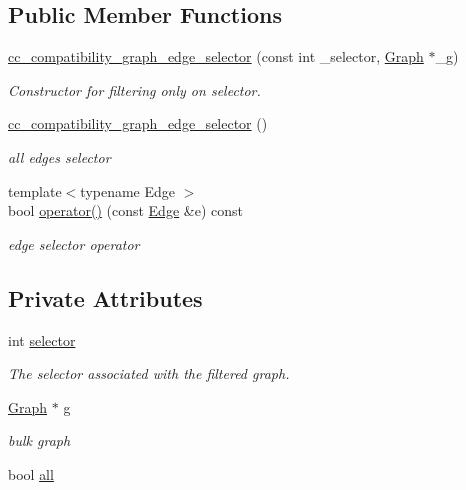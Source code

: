 \subsection*{Public Member Functions}
\begin{DoxyCompactItemize}
\item 
\hyperlink{structcc__compatibility__graph__edge__selector_af34c1bcbf2c4c00e91c295d1c53b2cab}{cc\+\_\+compatibility\+\_\+graph\+\_\+edge\+\_\+selector} (const int \+\_\+selector, \hyperlink{structGraph}{Graph} $\ast$\+\_\+g)
\begin{DoxyCompactList}\small\item\em Constructor for filtering only on selector. \end{DoxyCompactList}\item 
\hyperlink{structcc__compatibility__graph__edge__selector_a0382cacea886b26aa0159f2982160e4f}{cc\+\_\+compatibility\+\_\+graph\+\_\+edge\+\_\+selector} ()
\begin{DoxyCompactList}\small\item\em all edges selector \end{DoxyCompactList}\item 
{\footnotesize template$<$typename Edge $>$ }\\bool \hyperlink{structcc__compatibility__graph__edge__selector_aaf804ff43aded2dc5261789e2e673cc5}{operator()} (const \hyperlink{structEdge}{Edge} \&e) const
\begin{DoxyCompactList}\small\item\em edge selector operator \end{DoxyCompactList}\end{DoxyCompactItemize}
\subsection*{Private Attributes}
\begin{DoxyCompactItemize}
\item 
int \hyperlink{structcc__compatibility__graph__edge__selector_a1f76a7b1a5eff2f63722f283f3d12e26}{selector}
\begin{DoxyCompactList}\small\item\em The selector associated with the filtered graph. \end{DoxyCompactList}\item 
\hyperlink{structGraph}{Graph} $\ast$ \hyperlink{structcc__compatibility__graph__edge__selector_a763eb0a750fc3472fd179fb371de50e0}{g}
\begin{DoxyCompactList}\small\item\em bulk graph \end{DoxyCompactList}\item 
bool \hyperlink{structcc__compatibility__graph__edge__selector_a33232f3588d2f8aef8fd538901d694f2}{all}
\end{DoxyCompactItemize}


